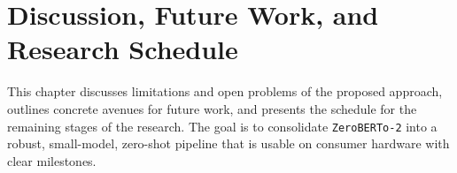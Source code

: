 \documentclass[]{politex-xico}
\begin{document}




\chapter{Discussion, Future Work, and Research Schedule}
\label{chapter_conc}

This chapter discusses limitations and open problems of the proposed approach, outlines concrete avenues for future work, and presents the schedule for the remaining stages of the research. The goal is to consolidate \texttt{ZeroBERTo-2} into a robust, small-model, zero-shot pipeline that is usable on consumer hardware with clear milestones.
\end{document}
